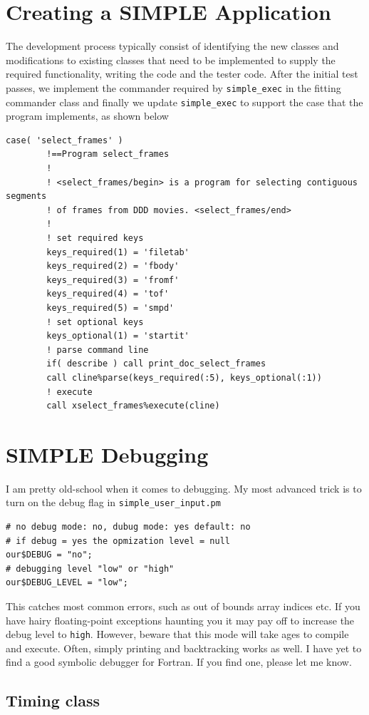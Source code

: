 \documentclass[a4paper,11pt]{article}
\begin{document}
\section{Creating a SIMPLE Application}
The development process typically consist of identifying the new classes and modifications to existing classes that need to be implemented to supply the required functionality, writing the code and the tester code. After the initial test passes,  we implement the commander required by \texttt{simple\_exec} in the fitting commander class and finally we update \texttt{simple\_exec} to support the case that the program implements, as shown below
\begin{verbatim}
case( 'select_frames' )
        !==Program select_frames
        !
        ! <select_frames/begin> is a program for selecting contiguous segments 
        ! of frames from DDD movies. <select_frames/end>
        !
        ! set required keys
        keys_required(1) = 'filetab'
        keys_required(2) = 'fbody'
        keys_required(3) = 'fromf'
        keys_required(4) = 'tof'
        keys_required(5) = 'smpd'
        ! set optional keys
        keys_optional(1) = 'startit'
        ! parse command line
        if( describe ) call print_doc_select_frames
        call cline%parse(keys_required(:5), keys_optional(:1))
        ! execute
        call xselect_frames%execute(cline)
\end{verbatim}

\section{SIMPLE Debugging}
I am pretty old-school when it comes to debugging. My most advanced trick is to turn on the debug flag in \texttt{simple\_user\_input.pm}
\begin{verbatim}
# no debug mode: no, dubug mode: yes default: no
# if debug = yes the opmization level = null
our$DEBUG = "no";
# debugging level "low" or "high"
our$DEBUG_LEVEL = "low";
\end{verbatim}
This catches most common errors, such as out of bounds array indices etc. If you have hairy floating-point exceptions haunting you it may pay off to increase the debug level to \texttt{high}. However, beware that this mode will take ages to compile and execute. Often, simply printing and backtracking works as well. I have yet to find a good symbolic debugger for Fortran. If you find one, please let me know.


\subsection{Timing class}
\label{sec:org636d6da}
\end{document}
